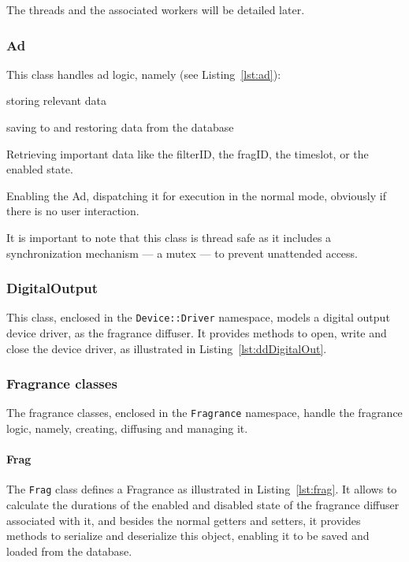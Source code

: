 The threads and the associated workers will be detailed later.

\subsubsection{Ad}
\label{sec:ad}
This class handles ad logic, namely (see Listing~\ref{lst:ad}):
\begin{item-c}
\item storing relevant data
\item saving to and restoring data from the database
\item Retrieving important data like the filterID, the fragID, the timeslot, or
  the enabled state.
\item Enabling the Ad, dispatching it for execution in the normal mode,
  obviously if there is no user interaction.
\end{item-c}
It is important to note that this class is thread safe as it includes a
synchronization mechanism --- a mutex --- to prevent unattended access.



\subsubsection{DigitalOutput}
\label{sec:digitaloutput}
This class, enclosed in the \texttt{Device::Driver} namespace, models a digital
output device driver, as the fragrance diffuser. It provides methods to open,
write and close the device driver, as illustrated in Listing~\ref{lst:ddDigitalOut}.



\subsubsection{Fragrance classes}
\label{sec:fragrance-classes}
The fragrance classes, enclosed in the \texttt{Fragrance} namespace, handle the
fragrance logic, namely, creating, diffusing and managing it.

\paragraph{\textbf{Frag}}
The \texttt{Frag} class defines a Fragrance as illustrated in
Listing~\ref{lst:frag}. It allows to calculate the durations of the enabled and
disabled state of the fragrance diffuser associated with it, and besides the
normal getters and setters, it provides methods to serialize and deserialize
this object, enabling it to be saved and loaded from the database.

